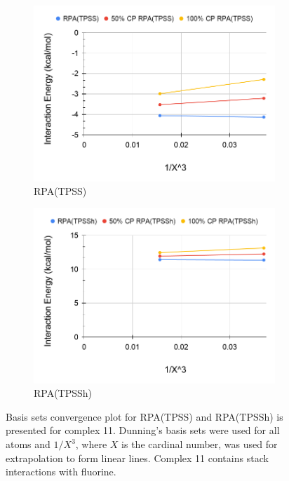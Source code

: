 \documentclass[11pt]{article}
\begin{document}
\begin{figure}[hbpt]
  \centering
  \begin{subfigure}{.5\textwidth}
    \centering
    \includegraphics[scale=0.3]{tpss-11.png}
    \caption{RPA(TPSS)}
    \label{fig:tpss11}
  \end{subfigure}%
  \begin{subfigure}{.5\textwidth}
    \centering
    \includegraphics[scale=0.3]{tpssh-11.png}
    \caption{RPA(TPSSh)}
    \label{fig:tpssh_11}
  \end{subfigure}
  \caption{Basis sets convergence plot for RPA(TPSS) and RPA(TPSSh) is
    presented for complex 11. Dunning's basis sets were used for all
    atoms and $1/X^3$, where $X$ is the cardinal number, was used for
    extrapolation to form linear lines. Complex 11 contains stack
    interactions with fluorine.}
  \label{fig:complex_11}
\end{figure}
\end{document}
